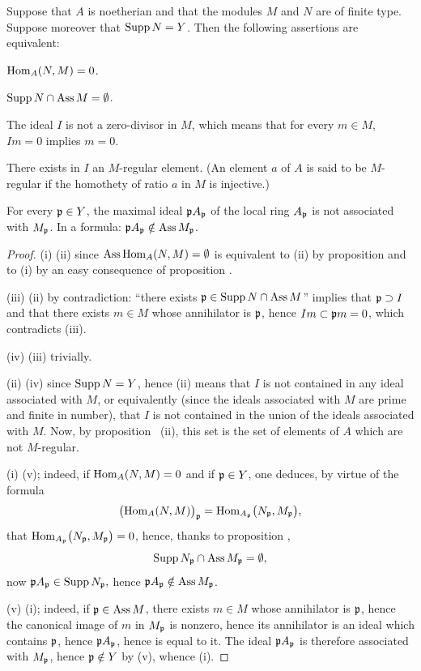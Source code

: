 \begin{lemma} \label{III.2.1}
Suppose that \(A\) is noetherian and that the modules \(M\) and \(N\)
are of finite type. Suppose moreover that \(\operatorname{Supp} N=Y\). Then the
following assertions are equivalent:
\begin{enumeratei}
\item
\(\operatorname{Hom}_A(N, M)=0\).
\item
\(\operatorname{Supp} N \cap \operatorname{Ass} M = \emptyset\).
\item
The ideal \(I\) is not a zero-divisor in \(M\), which means that for
every \(m\in M\), \(Im=0\) implies \(m=0\).
\item
There exists in \(I\) an \(M\)-regular element. (An element \(a\) of
\(A\) is said to be \(M\)-regular if the homothety of ratio \(a\) in
\(M\) is injective.)

\item
For every \(\mathfrak{p} \in Y\), the maximal ideal \(\mathfrak{p} A_{\mathfrak{p}}\) of the local
ring \(A_{\mathfrak{p}}\) is not associated with \(M_{\mathfrak{p}}\). In a formula:
\(\mathfrak{p} A_{\mathfrak{p}} \notin \operatorname{Ass} M_{\mathfrak{p}}\).
\end{enumeratei}
\end{lemma}

\begin{proof}
(i) \SSI (ii) since \(\operatorname{Ass} \operatorname{Hom}_A(N, M)=\emptyset\) is equivalent to
(ii) by proposition  and to (i) by an easy consequence of
proposition .

(iii) \ALORS (ii) by contradiction: ``there exists
\(\mathfrak{p} \in \operatorname{Supp} N \cap \operatorname{Ass} M\)'' implies that \(\mathfrak{p} \supset I\) and
that there exists \(m\in M\) whose annihilator is \(\mathfrak{p} \), hence
\(Im \subset \mathfrak{p} m=0\), which contradicts (iii).

(iv) \ALORS (iii) trivially.

(ii) \SSI (iv) since \(\operatorname{Supp} N = Y\), hence (ii) means that \(I\) is
not contained in any ideal associated with \(M\), or equivalently
(since the ideals associated with \(M\) are prime and finite in
number), that \(I\) is not contained in the union of the ideals
associated with \(M\). Now, by proposition ~(ii), this set
is the set of elements of \(A\) which are not \(M\)-regular.

(i) \ALORS (v); indeed, if \(\operatorname{Hom}_A(N, M)=0\) and if \(\mathfrak{p} \in Y\), one
deduces, by virtue of the formula
\[
\bigl(\operatorname{Hom}_A(N, M) \bigr)_{\mathfrak{p}} = \operatorname{Hom}_{A_{\mathfrak{p}}} \bigl(N_{\mathfrak{p}}, M_{\mathfrak{p}} \bigr),
\]
that \(\operatorname{Hom}_{A_{\mathfrak{p}}} \bigl(N_{\mathfrak{p}}, M_{\mathfrak{p}} \bigr)=0\), hence, thanks to
proposition ,
\[
\operatorname{Supp} N_{\mathfrak{p}} \cap \operatorname{Ass} M_{\mathfrak{p}} = \emptyset,
\]
now \(\mathfrak{p} A_{\mathfrak{p}} \in \operatorname{Supp} N_{\mathfrak{p}}, \) hence \( \mathfrak{p} A_{\mathfrak{p}} \notin \operatorname{Ass} M_{\mathfrak{p}}\).

(v) \ALORS (i); indeed, if \(\mathfrak{p} \in \operatorname{Ass} M\), there exists \(m\in M\)
whose annihilator is \(\mathfrak{p}\), hence the canonical image of \(m\) in
\(M_{\mathfrak{p}}\) is nonzero, hence its annihilator is an ideal which contains
\(\mathfrak{p}\), hence \(\mathfrak{p} A_{\mathfrak{p}}\), hence is equal to it. The ideal
\(\mathfrak{p} A_{\mathfrak{p}}\) is therefore associated with \(M_{\mathfrak{p}}\), hence
\(\mathfrak{p} \notin Y\) by (v), whence (i).
\end{proof}

